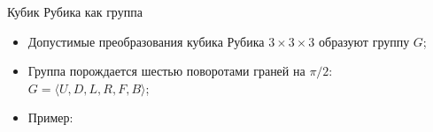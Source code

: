 \documentclass[serif, aspectratio=169]{beamer}
\begin{document}
\begin{frame}{Кубик Рубика как группа}
    \begin{itemize}
        \item Допустимые преобразования кубика Рубика $3\times3\times3$ образуют группу $G$;
        \item Группа порождается шестью поворотами граней на $\pi/2$: $G=\langle U,D,L,R,F,B\rangle$;
        \item Пример:
        \vspace{-1ex}
        \begin{center}



\end{center}
\end{itemize}
\end{frame}
\end{document}
